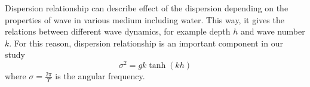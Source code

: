 Dispersion relationship can describe effect of the dispersion depending on the properties of wave in various medium including water. This way, it gives the relations between different wave dynamics, for example depth ${h}$ and wave number ${k}$. For this reason, dispersion relationship is an important component in our study \cite{dean1991water}
\begin{equation}\label{eqn:dispersion}
\sigma^2=gk\tanh(kh)
\end{equation}
where ${\sigma=\frac{2\pi}{T}}$ is the angular frequency.  
%
%
%
